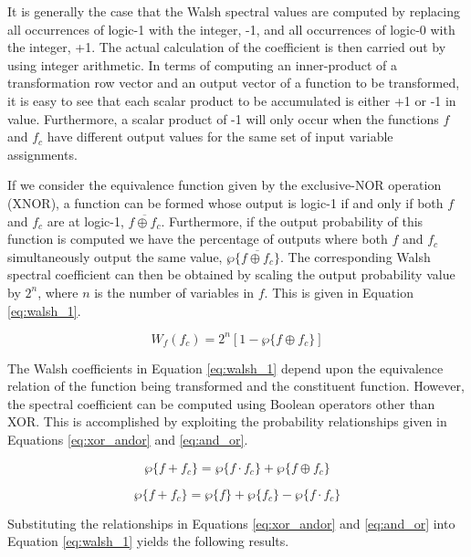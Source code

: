 It is generally the case that the Walsh spectral values are computed by replacing
all occurrences of logic-1 with the integer, -1, and all occurrences of logic-0
with the integer, +1.  The actual calculation of the coefficient is then
carried out by using integer arithmetic.  In terms of computing an inner-product
of a transformation row vector and an output vector of a function to be transformed,
it is easy to see that each scalar product to be accumulated is either +1 or -1 in value.
Furthermore, a scalar product of -1 will only occur when the functions $f$ and $f_c$ have
different output values for the same set of input variable assignments.

If we consider the equivalence function given by the exclusive-NOR operation (XNOR),
a function can be formed whose output is logic-1 if and only if both $f$ and $f_c$ are at
logic-1, $\overline{f \oplus f_c}$.  Furthermore, if the output probability of this function
is computed we have the percentage of outputs where both $f$ and $f_c$ simultaneously
output the same value, $\wp \{ \overline{f \oplus f_c} \}$.  The corresponding Walsh
spectral coefficient can then be obtained by scaling the output probability value by
$2^n$, where $n$ is the number of variables in $f$.  This is given in Equation
\ref{eq:walsh_1}.

\begin{equation}
W_f(f_c) = 2^n [ 1- \wp \{ f \oplus f_c \} ]    \label{eq:walsh_1}
\end{equation}

The Walsh coefficients in Equation \ref{eq:walsh_1} depend upon the equivalence relation of
the function being transformed and the constituent function.  However, the spectral 
coefficient can be computed using Boolean operators other than XOR.  This is accomplished by
exploiting the probability relationships given in Equations \ref{eq:xor_andor}
and \ref{eq:and_or}.

\begin{equation}
\wp \{f+f_c\} = \wp \{ f \cdot f_c \} + \wp \{ f \oplus f_c \}   \label{eq:xor_andor}
\end{equation}

\begin{equation}
\wp \{f+f_c\} = \wp \{ f \} + \wp \{ f_c \} - \wp \{ f \cdot f_c \}   \label{eq:and_or}
\end{equation}

Substituting the relationships in Equations \ref{eq:xor_andor} and 
\ref{eq:and_or} into Equation 
\ref{eq:walsh_1} yields the following results.

